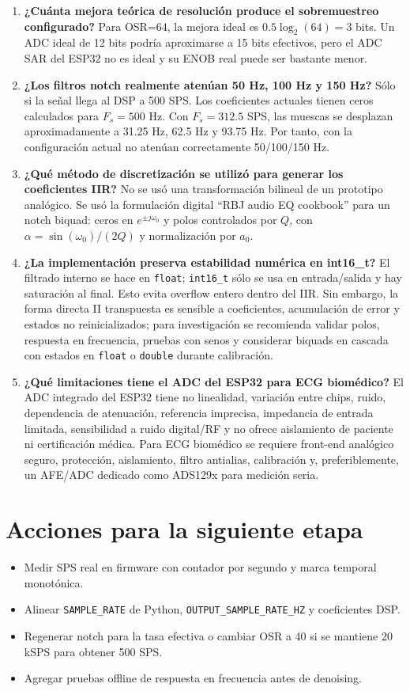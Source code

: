 \documentclass[11pt]{article}
\begin{document}
\begin{enumerate}
\item \textbf{¿Cuánta mejora teórica de resolución produce el sobremuestreo configurado?}  Para OSR=64, la mejora ideal es $0.5\log_2(64)=3$ bits. Un ADC ideal de 12 bits podría aproximarse a 15 bits efectivos, pero el ADC SAR del ESP32 no es ideal y su ENOB real puede ser bastante menor.
\item \textbf{¿Los filtros notch realmente atenúan 50 Hz, 100 Hz y 150 Hz?}  Sólo si la señal llega al DSP a 500 SPS. Los coeficientes actuales tienen ceros calculados para $F_s=500$ Hz. Con $F_s=312.5$ SPS, las muescas se desplazan aproximadamente a 31.25 Hz, 62.5 Hz y 93.75 Hz. Por tanto, con la configuración actual no atenúan correctamente 50/100/150 Hz.
\item \textbf{¿Qué método de discretización se utilizó para generar los coeficientes IIR?}  No se usó una transformación bilineal de un prototipo analógico. Se usó la formulación digital ``RBJ audio EQ cookbook'' para un notch biquad: ceros en $e^{\pm j\omega_0}$ y polos controlados por $Q$, con $\alpha=\sin(\omega_0)/(2Q)$ y normalización por $a_0$.
\item \textbf{¿La implementación preserva estabilidad numérica en int16\_t?}  El filtrado interno se hace en \texttt{float}; \texttt{int16\_t} sólo se usa en entrada/salida y hay saturación al final. Esto evita overflow entero dentro del IIR. Sin embargo, la forma directa II transpuesta es sensible a coeficientes, acumulación de error y estados no reinicializados; para investigación se recomienda validar polos, respuesta en frecuencia, pruebas con senos y considerar biquads en cascada con estados en \texttt{float} o \texttt{double} durante calibración.
\item \textbf{¿Qué limitaciones tiene el ADC del ESP32 para ECG biomédico?}  El ADC integrado del ESP32 tiene no linealidad, variación entre chips, ruido, dependencia de atenuación, referencia imprecisa, impedancia de entrada limitada, sensibilidad a ruido digital/RF y no ofrece aislamiento de paciente ni certificación médica. Para ECG biomédico se requiere front-end analógico seguro, protección, aislamiento, filtro antialias, calibración y, preferiblemente, un AFE/ADC dedicado como ADS129x para medición seria.
\end{enumerate}

\section{Acciones para la siguiente etapa}
\begin{itemize}
\item Medir SPS real en firmware con contador por segundo y marca temporal monotónica.
\item Alinear \texttt{SAMPLE\_RATE} de Python, \texttt{OUTPUT\_SAMPLE\_RATE\_HZ} y coeficientes DSP.
\item Regenerar notch para la tasa efectiva o cambiar OSR a 40 si se mantiene 20 kSPS para obtener 500 SPS.
\item Agregar pruebas offline de respuesta en frecuencia antes de denoising.
\end{itemize}
\end{document}

